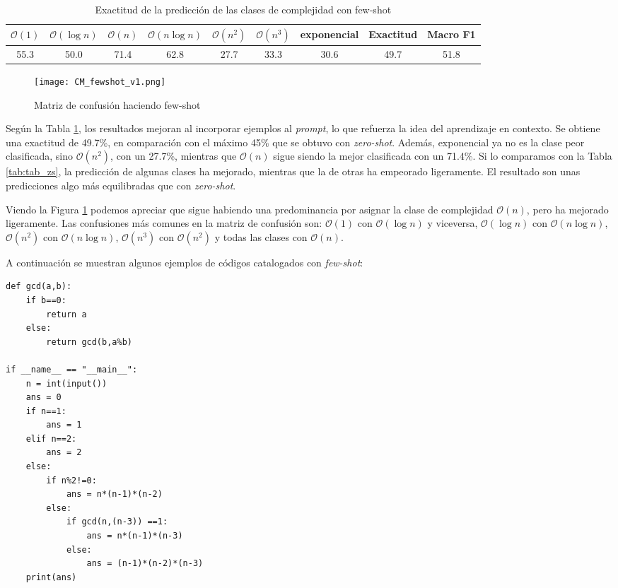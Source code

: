 \documentclass[12pt,twoside]{article}
\begin{document}
\begin{table}[H]
    \centering
    \small
    \begin{tabular}{c c c c c c c|c c}
        $\mathcal{O}(1)$ & $\mathcal{O}(\log n)$ & $\mathcal{O}(n)$ & $\mathcal{O}(n\log n)$ & $\mathcal{O}(n^2)$ & $\mathcal{O}(n^3)$ & exponencial & Exactitud & Macro F1 \\ \hline
        55.3 & 50.0 & 71.4 & 62.8 & 27.7 & 33.3 & 30.6 & 49.7 & 51.8
    \end{tabular}
    \normalsize
    \caption{Exactitud de la predicción de las clases de complejidad con few-shot}
    \label{tab:tab_fs}
\end{table}

\begin{figure}[H]
  \centering
    \texttt{[image: CM\_fewshot\_v1.png]}
  \caption{Matriz de confusión haciendo few-shot}
  \label{fig:confmat_fs}
\end{figure}

Según la Tabla \ref{tab:tab_fs}, los resultados mejoran al incorporar ejemplos al \textit{prompt}, lo que refuerza la idea del aprendizaje en contexto. Se obtiene una exactitud de 49.7\%, en comparación con el máximo 45\% que se obtuvo con \textit{zero-shot}. Además, exponencial ya no es la clase peor clasificada, sino $\mathcal{O}(n^2)$, con un 27.7\%, mientras que $\mathcal{O}(n)$ sigue siendo la mejor clasificada con un 71.4\%. Si lo comparamos con la Tabla \ref{tab:tab_zs}, la predicción de algunas clases ha mejorado, mientras que la de otras ha empeorado ligeramente. El resultado son unas predicciones algo más equilibradas que con \textit{zero-shot}.

Viendo la Figura \ref{fig:confmat_fs} podemos apreciar que sigue habiendo una predominancia por asignar la clase de complejidad $\mathcal{O}(n)$, pero ha mejorado ligeramente. Las confusiones más comunes en la matriz de confusión son: $\mathcal{O}(1)$ con $\mathcal{O}(\log n)$ y viceversa, $\mathcal{O}(\log n)$ con $\mathcal{O}(n\log n)$, $\mathcal{O}(n^2)$ con $\mathcal{O}(n\log n)$, $\mathcal{O}(n^3)$ con $\mathcal{O}(n^2)$ y todas las clases con $\mathcal{O}(n)$.

A continuación se muestran algunos ejemplos de códigos catalogados con \textit{few-shot}:

\begin{tcolorbox}[
  colback=gray!5,
  colframe=black,
  boxrule=0.5pt,
  breakable,
  title=$\mathcal{O}(1)$ catalogado como $\mathcal{O}(\log n)$,
]
\begin{verbatim}
def gcd(a,b):
    if b==0:
        return a
    else:
        return gcd(b,a%b)

if __name__ == "__main__":
    n = int(input())
    ans = 0
    if n==1:
        ans = 1
    elif n==2:
        ans = 2
    else:
        if n%2!=0:
            ans = n*(n-1)*(n-2)
        else:
            if gcd(n,(n-3)) ==1:
                ans = n*(n-1)*(n-3)
            else:
                ans = (n-1)*(n-2)*(n-3)
    print(ans)
\end{verbatim}
\end{tcolorbox}
\end{document}
